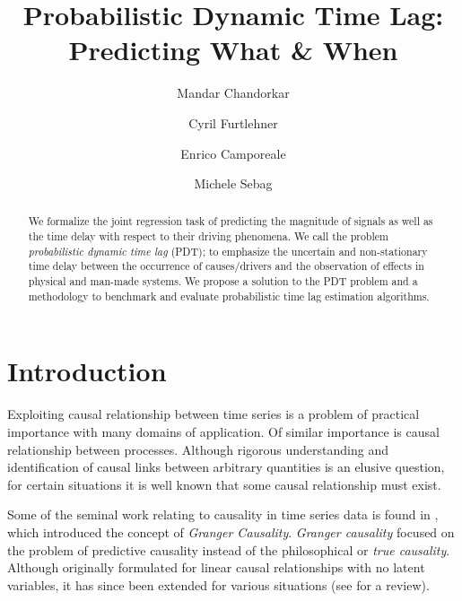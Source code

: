 \documentclass[envcountsect,runningheads]{llncs}
\theoremstyle{etoile}
\begin{document}
%
\title{Probabilistic Dynamic Time Lag: Predicting What \& When}
%
%
\author{Mandar Chandorkar \and
Cyril Furtlehner \and
Enrico Camporeale \and 
Michele Sebag
}
%
%
%
\maketitle              %
%
\begin{abstract}
      We formalize the joint regression task of predicting the magnitude of signals as well as the time delay with respect to their driving phenomena. 
      We call the problem \emph{probabilistic dynamic time lag} (PDT); to emphasize the uncertain and non-stationary time delay between the occurrence of 
      causes/drivers and the observation of effects in physical and man-made systems. We propose a solution to the PDT problem and a methodology to 
      benchmark and evaluate probabilistic time lag estimation algorithms.
\end{abstract}

\section{Introduction}
Exploiting causal relationship between time series is a problem of practical importance 
with many domains of application. Of similar importance is causal relationship between processes. 
Although rigorous understanding and identification of causal links between arbitrary quantities 
is an elusive question, for certain situations it is well known that some causal relationship 
must exist. 

Some of the seminal work relating to causality in time series data is found in \cite{Granger}, 
which introduced the concept of \emph{Granger Causality}. \emph{Granger causality} focused on the 
problem of predictive causality instead of the philosophical or \emph{true causality}. Although 
originally formulated for linear causal relationships with no latent variables, it has since been 
extended for various situations (see \cite{doi:10.1002/9781119945710.ch22} for a review).
\end{document}
